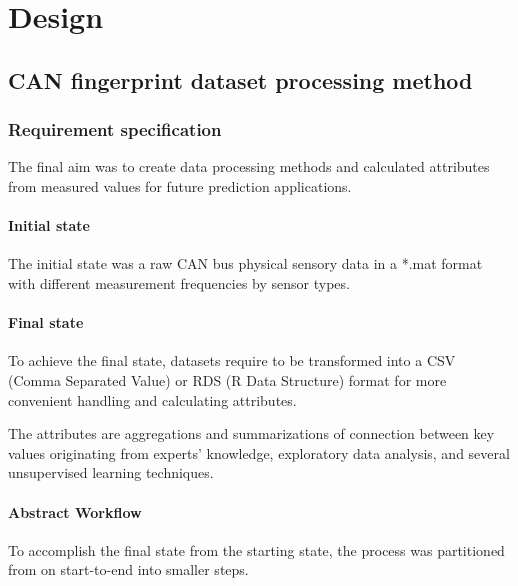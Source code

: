 \chapter{Design}
\section{CAN fingerprint dataset processing method}
\subsection{Requirement specification}
	\noindent
The final aim was to create data processing methods and calculated attributes from measured values for future prediction applications.
	\subsubsection{Initial state}
The initial state was a raw CAN bus physical sensory data in a *.mat format with different measurement frequencies by sensor types.
	\subsubsection{Final state}
To achieve the final state, datasets require to be transformed into a CSV (Comma Separated Value) or RDS (R Data Structure) format for more convenient handling and calculating attributes.

The attributes are aggregations and summarizations of connection between key values originating from experts' knowledge, exploratory data analysis, and several unsupervised learning techniques.
\clearpage
\subsubsection{Abstract Workflow}
To accomplish the final state from the starting state, the process was partitioned from on start-to-end into smaller steps. 

